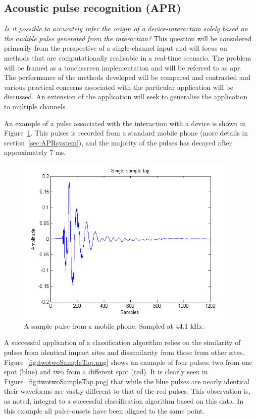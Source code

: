 \subsection{Acoustic pulse recognition (APR)}
\emph{Is it possible to accurately infer the origin of a device-interaction solely based on the audible pulse generated from the interaction?}
This question will be considered primarily from the perspective of a single-channel input and will focus on methods that are computationally realisable in a real-time scenario. The problem will be framed as a touchscreen implementation and will be referred to as \gls{apr}. The performance of the methods developed will be compared and contrasted and various practical concerns associated with the particular application will be discussed. An extension of the application will seek to generalise the application to multiple channels.

An example of a pulse associated with the interaction with a device is shown in Figure~\ref{fig:singleSampleTap.png}. This pulses is recorded from a standard mobile phone (more details in section~\ref{sec:APRsystem}), and the majority of the pulses has decayed after approximately 7 ms.

\begin{figure}
  \begin{center}
    \includegraphics[width=110mm]{singleSampleTap.png}
    \caption{A sample pulse from a mobile phone. Sampled at 44.1 kHz.}\label{fig:singleSampleTap.png}
  \end{center}
\end{figure}

A successful application of a classification algorithm relies on the similarity of pulses from identical impact sites and dissimilarity from those from other sites. Figure~\ref{fig:twotwoSampleTap.png} shows an example of four pulses: two from one spot (blue) and two from a different spot (red). It is clearly seen in Figure~\ref{fig:twotwoSampleTap.png} that while the blue pulses are nearly identical their waveforms are vastly different to that of the red pulses. This observation is, as noted, integral to a successful classification algorithm based on this data. In this example all pulse-onsets have been aligned to the same point.

